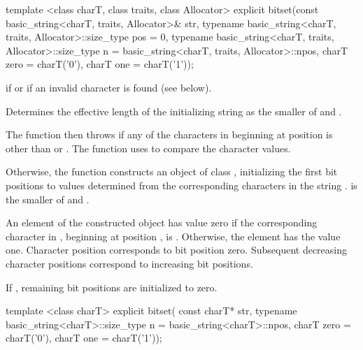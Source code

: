 %
\begin{itemdecl}
template <class charT, class traits, class Allocator>
explicit
bitset(const basic_string<charT, traits, Allocator>& str,
       typename basic_string<charT, traits, Allocator>::size_type pos = 0,
       typename basic_string<charT, traits, Allocator>::size_type n =
         basic_string<charT, traits, Allocator>::npos,
         charT zero = charT('0'), charT one = charT('1'));
\end{itemdecl}

\begin{itemdescr}
\pnum
\throws
{}
if
or  if an invalid character is found (see below).%

\pnum
\effects
Determines the effective length
 of the initializing string as the smaller of
 and
.

The function then throws%
if any of the 
characters in  beginning at position  is
other than  or . The function uses 
to compare the character values.

Otherwise, the function constructs an object of class
,
initializing the first  bit
positions to values determined from the corresponding characters in the string
.
 is the smaller of  and .

\pnum
An element of the constructed object has value zero if the
corresponding character in , beginning at position
, is
.
Otherwise, the element has the value one.
Character position  corresponds to bit position zero.
Subsequent decreasing character positions correspond to increasing bit positions.

\pnum
If , remaining bit positions are initialized to zero.
\end{itemdescr}

%
\begin{itemdecl}
template <class charT>
  explicit bitset(
    const charT* str,
    typename basic_string<charT>::size_type n = basic_string<charT>::npos,
    charT zero = charT('0'), charT one = charT('1'));
\end{itemdecl}

